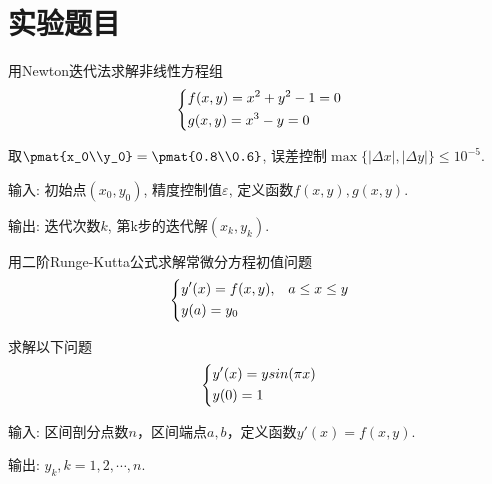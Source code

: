 \documentclass{nedsart}
\begin{document}
\maketitle

\tableofcontents

\section{实验题目}

\begin{project}\label{project:1}
    用Newton迭代法求解非线性方程组
    \begin{equation}\label{eq:nonlinear}
        \begin{dcases}
            f(x, y) = x^2 + y^2 - 1 = 0 \\
            g(x, y) = x^3 - y = 0
        \end{dcases}
    \end{equation}
    \par 取$\pmat{x_0\\y_0} = \pmat{0.8\\0.6}$, 误差控制$\max\{|\Delta{x}|, |\Delta{y}|\} \leq 10^{-5}$.
    \par 输入: 初始点$(x_0, y_0)$, 精度控制值$\varepsilon$, 定义函数$f(x, y), g(x, y)$.
    \par 输出: 迭代次数$k$, 第k步的迭代解$(x_k, y_k)$.
\end{project}

\begin{project}\label{project:2}
    用二阶Runge-Kutta公式求解常微分方程初值问题
    \begin{equation}\label{eq:diff}
        \begin{dcases}
            y'(x) = f(x, y), & a \leq x \leq y \\
            y(a) = y_0
        \end{dcases}
    \end{equation}
    \par 求解以下问题
    \begin{equation}\label{eq:ysin}
        \begin{dcases}
            y'(x) = ysin(\pi x) \\
            y(0) = 1
        \end{dcases}
    \end{equation}
    \par 输入: 区间剖分点数$n$，区间端点$a, b$，定义函数$y'(x) = f(x, y)$.
    \par 输出: $y_k, k = 1,2,\cdots,n$.
\end{project}
\end{document}
